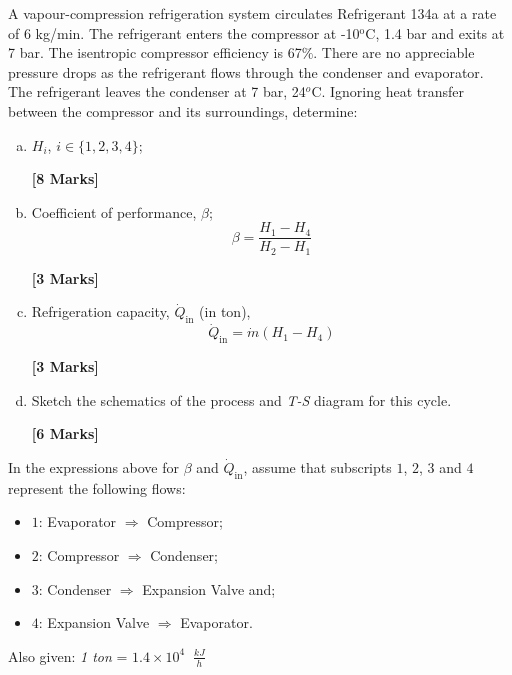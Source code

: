 \documentclass[calculator,refrigeranttables,datasheet,resit]{exam}
\newcommand{\frc}{\displaystyle\frac}
\begin{document}
\clearpage

\begin{question} A vapour-compression refrigeration system circulates Refrigerant 134a at a rate of 6 kg/min. The refrigerant enters the compressor at -10$^{\text{o}}$C, 1.4 bar and exits at 7 bar. The isentropic compressor efficiency is 67$\%$. There are no appreciable pressure drops as the refrigerant flows through the condenser and evaporator. The refrigerant leaves the condenser at 7 bar, 24$^{o}$C. Ignoring heat transfer between the compressor and its surroundings, determine:
\begin{enumerate}[(a)]
\item $H_{i}$, $i\in\{1,2,3,4\}$;
\begin{flushright}
{\bf [8 Marks]}
\end{flushright} 
\item Coefficient of performance, $\beta$;
\begin{displaymath}
\beta = \frc{H_{1}-H_{4}}{H_{2}-H_{1}}
\end{displaymath}
\begin{flushright}
{\bf [3 Marks]}
\end{flushright} 
\item Refrigeration capacity, $\dot{Q}_{\text{in}}$ (in ton),
\begin{displaymath}
\dot{Q}_{\text{in}}=\dot{m}\left(H_{1}-H_{4}\right)
\end{displaymath}
\begin{flushright}
{\bf [3 Marks]}
\end{flushright} 
\item Sketch the schematics of the process and {\it T-S} diagram for this cycle.
\begin{flushright}
{\bf [6 Marks]}
\end{flushright} 
\end{enumerate}
In the expressions above for $\beta$ and $\dot{Q}_{\text{in}}$, assume that subscripts $1$, $2$, $3$ and $4$ represent the following flows:
\begin{itemize}
\item $1$: Evaporator $\Rightarrow$ Compressor; 
\item $2$: Compressor $\Rightarrow$ Condenser; 
\item $3$: Condenser $\Rightarrow$  Expansion Valve and; 
\item $4$: Expansion Valve $\Rightarrow$   Evaporator.
\end{itemize}
Also given: {\it 1 ton} = $1.4\times 10^{4}\;\;\frc{kJ}{h}$
\end{question}
\end{document}
